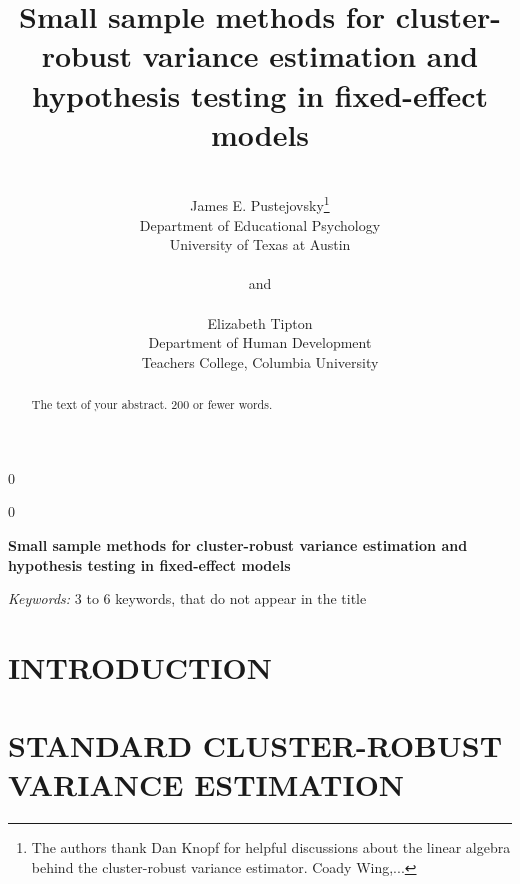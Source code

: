 \documentclass[12pt]{article}\usepackage[]{graphicx}\usepackage[]{color}
\newcommand{\blind}{0}
\begin{document}

\def\spacingset#1{\renewcommand{\baselinestretch}%
{#1}\small\normalsize} \spacingset{1}



\blind
{
  \title{\bf Small sample methods for cluster-robust variance estimation and hypothesis testing in fixed-effect models}
  \author{\\James E. Pustejovsky\thanks{
    The authors thank Dan Knopf for helpful discussions about the linear algebra behind the cluster-robust variance estimator. Coady Wing,...}\hspace{.2cm}\\
    Department of Educational Psychology \\ 
    University of Texas at Austin\\ \\
    and \\ \\
    Elizabeth Tipton \\
    Department of Human Development \\ 
    Teachers College, Columbia University}
  \maketitle
} \fi

\blind
{
  \bigskip
  \bigskip
  \bigskip
  \begin{center}
    {\LARGE\bf Small sample methods for cluster-robust variance estimation and hypothesis testing in fixed-effect models}
\end{center}
  \medskip
} \fi

\bigskip
\begin{abstract}
The text of your abstract.  200 or fewer words.
\end{abstract}

\noindent%
{\it Keywords:}  3 to 6 keywords, that do not appear in the title
\vfill

\newpage
\spacingset{1.45} %

\section{INTRODUCTION}
\label{sec:intro}




\section{STANDARD CLUSTER-ROBUST VARIANCE ESTIMATION}
\label{sec:CRVE}
\end{document}
